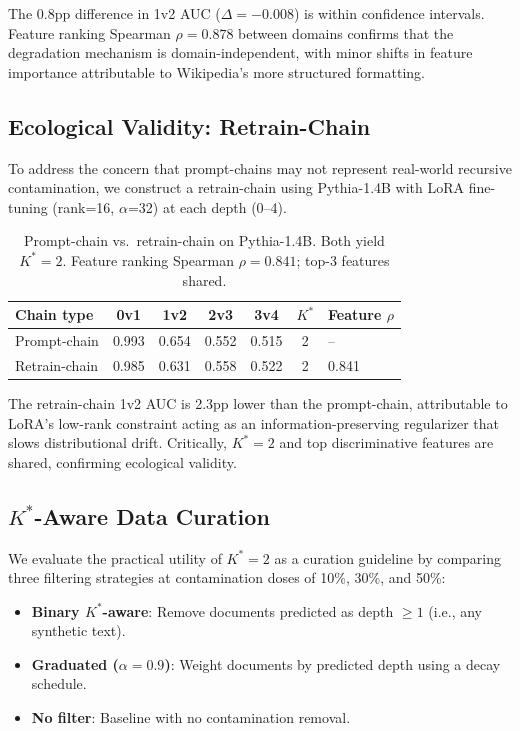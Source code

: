 \documentclass[11pt]{article}
\newcommand{\kstar}{K^{*}}
\begin{document}
The 0.8pp difference in 1v2 AUC ($\Delta = -0.008$) is within confidence intervals. Feature ranking Spearman $\rho = 0.878$ between domains confirms that the degradation mechanism is domain-independent, with minor shifts in feature importance attributable to Wikipedia's more structured formatting.

\subsection{Ecological Validity: Retrain-Chain}
\label{sec:retrain}

To address the concern that prompt-chains may not represent real-world recursive contamination, we construct a retrain-chain using Pythia-1.4B with LoRA fine-tuning (rank=16, $\alpha$=32) at each depth (0--4).

\begin{table}[t]
\centering
\caption{Prompt-chain vs.\ retrain-chain on Pythia-1.4B. Both yield $\kstar = 2$. Feature ranking Spearman $\rho = 0.841$; top-3 features shared.}
\label{tab:retrain}
\small
\begin{tabular}{lcccccl}
\toprule
\textbf{Chain type} & \textbf{0v1} & \textbf{1v2} & \textbf{2v3} & \textbf{3v4} & $\kstar$ & \textbf{Feature $\rho$} \\
\midrule
Prompt-chain & 0.993 & 0.654 & 0.552 & 0.515 & 2 & -- \\
Retrain-chain & 0.985 & 0.631 & 0.558 & 0.522 & 2 & 0.841 \\
\bottomrule
\end{tabular}
\end{table}

The retrain-chain 1v2 AUC is 2.3pp lower than the prompt-chain, attributable to LoRA's low-rank constraint acting as an information-preserving regularizer that slows distributional drift. Critically, $\kstar = 2$ and top discriminative features are shared, confirming ecological validity.

\subsection{$\kstar$-Aware Data Curation}
\label{sec:curation}

We evaluate the practical utility of $\kstar = 2$ as a curation guideline by comparing three filtering strategies at contamination doses of 10\%, 30\%, and 50\%:
\begin{itemize}
  \item \textbf{Binary $\kstar$-aware}: Remove documents predicted as depth $\geq 1$ (i.e., any synthetic text).
  \item \textbf{Graduated ($\alpha = 0.9$)}: Weight documents by predicted depth using a decay schedule.
  \item \textbf{No filter}: Baseline with no contamination removal.
\end{itemize}
\end{document}
